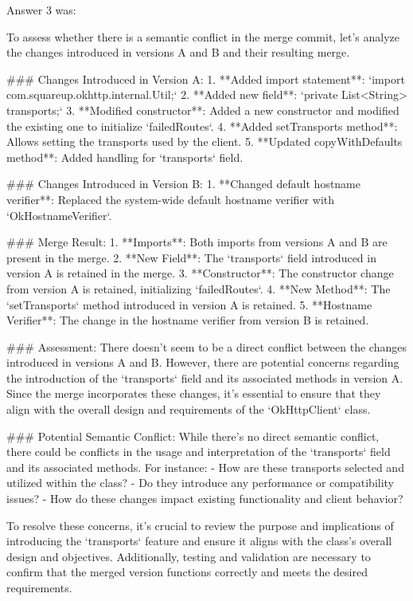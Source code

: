 Answer 3 was:
\begin{spverbatim}
To assess whether there is a semantic conflict in the merge commit, let's analyze the changes introduced in versions A and B and their resulting merge.

### Changes Introduced in Version A:
1. **Added import statement**: `import com.squareup.okhttp.internal.Util;`
2. **Added new field**: `private List<String> transports;`
3. **Modified constructor**: Added a new constructor and modified the existing one to initialize `failedRoutes`.
4. **Added setTransports method**: Allows setting the transports used by the client.
5. **Updated copyWithDefaults method**: Added handling for `transports` field.

### Changes Introduced in Version B:
1. **Changed default hostname verifier**: Replaced the system-wide default hostname verifier with `OkHostnameVerifier`.

### Merge Result:
1. **Imports**: Both imports from versions A and B are present in the merge.
2. **New Field**: The `transports` field introduced in version A is retained in the merge.
3. **Constructor**: The constructor change from version A is retained, initializing `failedRoutes`.
4. **New Method**: The `setTransports` method introduced in version A is retained.
5. **Hostname Verifier**: The change in the hostname verifier from version B is retained.

### Assessment:
There doesn't seem to be a direct conflict between the changes introduced in versions A and B. However, there are potential concerns regarding the introduction of the `transports` field and its associated methods in version A. Since the merge incorporates these changes, it's essential to ensure that they align with the overall design and requirements of the `OkHttpClient` class.

### Potential Semantic Conflict:
While there's no direct semantic conflict, there could be conflicts in the usage and interpretation of the `transports` field and its associated methods. For instance:
- How are these transports selected and utilized within the class?
- Do they introduce any performance or compatibility issues?
- How do these changes impact existing functionality and client behavior?

To resolve these concerns, it's crucial to review the purpose and implications of introducing the `transports` feature and ensure it aligns with the class's overall design and objectives. Additionally, testing and validation are necessary to confirm that the merged version functions correctly and meets the desired requirements.
\end{spverbatim}

